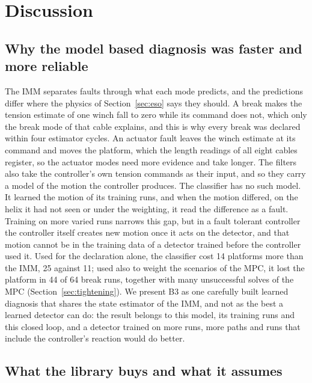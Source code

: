 \documentclass[a4paper,fleqn]{cas-dc}
\begin{document}
\section{Discussion}\label{sec:discussion}

\subsection{Why the model based diagnosis was faster and more reliable}\label{sec:why}

The IMM separates faults through what each mode predicts, and the predictions differ where the physics of Section~\ref{sec:eso} says they should. A break makes the tension estimate of one winch fall to zero while its command does not, which only the break mode of that cable explains, and this is why every break was declared within four estimator cycles. An actuator fault leaves the winch estimate at its command and moves the platform, which the length readings of all eight cables register, so the actuator modes need more evidence and take longer. The filters also take the controller's own tension commands as their input, and so they carry a model of the motion the controller produces. The classifier has no such model. It learned the motion of its training runs, and when the motion differed, on the helix it had not seen or under the weighting, it read the difference as a fault. Training on more varied runs narrows this gap, but in a fault tolerant controller the controller itself creates new motion once it acts on the detector, and that motion cannot be in the training data of a detector trained before the controller used it. Used for the declaration alone, the classifier cost 14 platforms more than the IMM, 25 against 11; used also to weight the scenarios of the MPC, it lost the platform in 44 of 64 break runs, together with many unsuccessful solves of the MPC (Section~\ref{sec:tightening}). We present B3 as one carefully built learned diagnosis that shares the state estimator of the IMM, and not as the best a learned detector can do: the result belongs to this model, its training runs and this closed loop, and a detector trained on more runs, more paths and runs that include the controller's reaction would do better.

\subsection{What the library buys and what it assumes}\label{sec:librarydiscussion}
\end{document}
